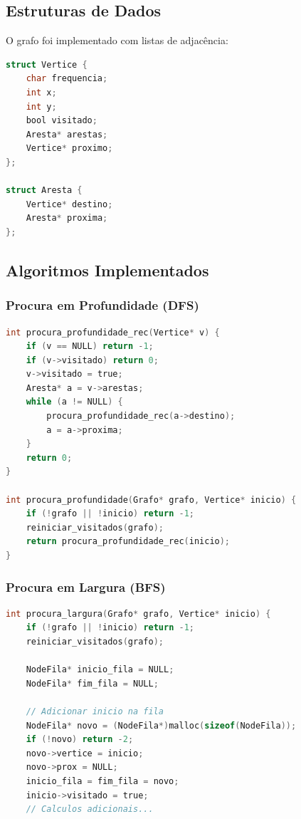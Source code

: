 \documentclass[a4paper,12pt]{report}
\begin{document}
\subsection{Estruturas de Dados}
O grafo foi implementado com listas de adjacência:

\begin{lstlisting}[language=C]
struct Vertice {
    char frequencia;
    int x;
    int y;
    bool visitado;
    Aresta* arestas;
    Vertice* proximo;
};

struct Aresta {
    Vertice* destino;
    Aresta* proxima;
};
\end{lstlisting}

\subsection{Algoritmos Implementados}
\subsubsection{Procura em Profundidade (DFS)}

\begin{lstlisting}[language=C]
int procura_profundidade_rec(Vertice* v) {
    if (v == NULL) return -1;
    if (v->visitado) return 0;
    v->visitado = true;
    Aresta* a = v->arestas;
    while (a != NULL) {
        procura_profundidade_rec(a->destino);
        a = a->proxima;
    }
    return 0;
}

int procura_profundidade(Grafo* grafo, Vertice* inicio) {
    if (!grafo || !inicio) return -1;
    reiniciar_visitados(grafo);
    return procura_profundidade_rec(inicio);
}

\end{lstlisting}
\subsubsection{Procura em Largura (BFS)}

\begin{lstlisting}[language=C]
int procura_largura(Grafo* grafo, Vertice* inicio) {
    if (!grafo || !inicio) return -1;
    reiniciar_visitados(grafo);
    
    NodeFila* inicio_fila = NULL;
    NodeFila* fim_fila = NULL;
    
    // Adicionar inicio na fila
    NodeFila* novo = (NodeFila*)malloc(sizeof(NodeFila));
    if (!novo) return -2;
    novo->vertice = inicio;
    novo->prox = NULL;
    inicio_fila = fim_fila = novo;
    inicio->visitado = true;
    // Calculos adicionais...

\end{lstlisting}
\end{document}
